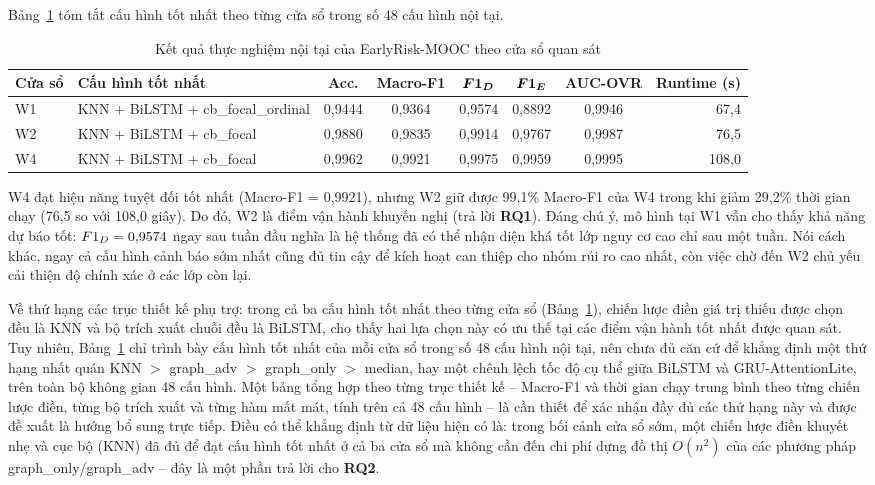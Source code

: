 Bảng~\ref{tab:noitai} tóm tắt cấu hình tốt nhất theo từng cửa sổ trong số 48 cấu hình nội tại.

\begin{table}[H]
\centering
\caption{Kết quả thực nghiệm nội tại của EarlyRisk-MOOC theo cửa sổ quan sát}
\label{tab:noitai}
\renewcommand{\arraystretch}{1.3}
\footnotesize
\begin{tabular}{@{}l l ccccc r@{}}
\toprule
\textbf{Cửa sổ} & \textbf{Cấu hình tốt nhất} & \textbf{Acc.} & \textbf{Macro-F1} & $\boldsymbol{F1_{D}}$ & $\boldsymbol{F1_{E}}$ & \textbf{AUC-OVR} & \textbf{Runtime (s)} \\
\midrule
W1 & KNN + BiLSTM + cb\_focal\_ordinal & 0,9444 & 0,9364 & 0,9574 & 0,8892 & 0,9946 & 67,4 \\
W2 & KNN + BiLSTM + cb\_focal & 0,9880 & 0,9835 & 0,9914 & 0,9767 & 0,9987 & 76,5 \\
W4 & KNN + BiLSTM + cb\_focal & 0,9962 & 0,9921 & 0,9975 & 0,9959 & 0,9995 & 108,0 \\
\bottomrule
\end{tabular}
\end{table}

W4 đạt hiệu năng tuyệt đối tốt nhất (Macro-F1 = 0,9921), nhưng W2 giữ được 99,1\% Macro-F1 của W4 trong khi giảm 29,2\% thời gian chạy (76,5 so với 108,0 giây). Do đó, W2 là điểm vận hành khuyến nghị (trả lời \textbf{RQ1}). Đáng chú ý, mô hình tại W1 vẫn cho thấy khả năng dự báo tốt: $F1_{D} = 0{,}9574$ ngay sau tuần đầu nghĩa là hệ thống đã có thể nhận diện khá tốt lớp nguy cơ cao chỉ sau một tuần. Nói cách khác, ngay cả cấu hình cảnh báo sớm nhất cũng đủ tin cậy để kích hoạt can thiệp cho nhóm rủi ro cao nhất, còn việc chờ đến W2 chủ yếu cải thiện độ chính xác ở các lớp còn lại.

Về thứ hạng các trục thiết kế phụ trợ: trong cả ba cấu hình tốt nhất theo từng cửa sổ (Bảng~\ref{tab:noitai}), chiến lược điền giá trị thiếu được chọn đều là KNN và bộ trích xuất chuỗi đều là BiLSTM, cho thấy hai lựa chọn này có ưu thế tại các điểm vận hành tốt nhất được quan sát. Tuy nhiên, Bảng~\ref{tab:noitai} chỉ trình bày cấu hình tốt nhất của mỗi cửa sổ trong số 48 cấu hình nội tại, nên chưa đủ căn cứ để khẳng định một thứ hạng nhất quán KNN $>$ graph\_adv $>$ graph\_only $>$ median, hay một chênh lệch tốc độ cụ thể giữa BiLSTM và GRU-AttentionLite, trên toàn bộ không gian 48 cấu hình. Một bảng tổng hợp theo từng trục thiết kế -- Macro-F1 và thời gian chạy trung bình theo từng chiến lược điền, từng bộ trích xuất và từng hàm mất mát, tính trên cả 48 cấu hình -- là cần thiết để xác nhận đầy đủ các thứ hạng này và được đề xuất là hướng bổ sung trực tiếp. Điều có thể khẳng định từ dữ liệu hiện có là: trong bối cảnh cửa sổ sớm, một chiến lược điền khuyết nhẹ và cục bộ (KNN) đã đủ để đạt cấu hình tốt nhất ở cả ba cửa sổ mà không cần đến chi phí dựng đồ thị $O(n^2)$ của các phương pháp graph\_only/graph\_adv -- đây là một phần trả lời cho \textbf{RQ2}.

